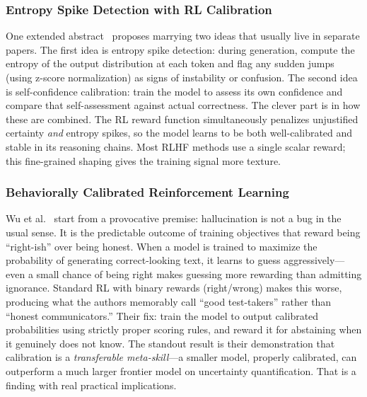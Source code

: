 \documentclass[journal]{IEEEtran}
\begin{document}
\subsubsection{Entropy Spike Detection with RL Calibration}
One extended abstract~\cite{entropy_spike} proposes marrying two ideas that usually live in separate papers. The first idea is entropy spike detection: during generation, compute the entropy of the output distribution at each token and flag any sudden jumps (using z-score normalization) as signs of instability or confusion. The second idea is self-confidence calibration: train the model to assess its own confidence and compare that self-assessment against actual correctness. The clever part is in how these are combined. The RL reward function simultaneously penalizes unjustified certainty \emph{and} entropy spikes, so the model learns to be both well-calibrated and stable in its reasoning chains. Most RLHF methods use a single scalar reward; this fine-grained shaping gives the training signal more texture.

\subsubsection{Behaviorally Calibrated Reinforcement Learning}
Wu et al.~\cite{calibrated_rl} start from a provocative premise: hallucination is not a bug in the usual sense. It is the predictable outcome of training objectives that reward being ``right-ish'' over being honest. When a model is trained to maximize the probability of generating correct-looking text, it learns to guess aggressively---even a small chance of being right makes guessing more rewarding than admitting ignorance. Standard RL with binary rewards (right/wrong) makes this worse, producing what the authors memorably call ``good test-takers'' rather than ``honest communicators.'' Their fix: train the model to output calibrated probabilities using strictly proper scoring rules, and reward it for abstaining when it genuinely does not know. The standout result is their demonstration that calibration is a \emph{transferable meta-skill}---a smaller model, properly calibrated, can outperform a much larger frontier model on uncertainty quantification. That is a finding with real practical implications.
\end{document}
